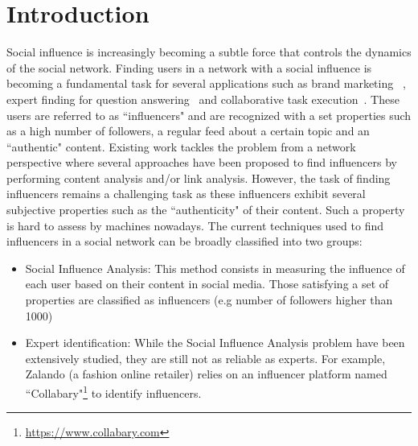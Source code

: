 \documentclass{article}
\begin{document}
\section{Introduction}
Social influence is increasingly becoming a subtle force that controls the dynamics of the social network. 
Finding users in a network with a social influence is becoming a fundamental 
task for several applications such as brand marketing
~\cite{bond201261,richardson2002mining,van2007new}, expert finding for question 
answering~\cite{riahi2012finding} and collaborative task execution~\cite{sun2014analyzing,miao2010generative}. These users are referred to as ``influencers"
and are recognized with a set properties such as a high number of 
followers, a regular feed about a certain topic and an ``authentic" content.
 Existing work tackles the problem from a network perspective where 
 several approaches have been proposed to find influencers by performing content analysis and/or link analysis. However, the task of finding influencers remains a challenging task as these influencers
exhibit several subjective properties such as the ``authenticity" of their
content. Such a property is hard to assess by machines nowadays.
The current techniques used to find influencers in a social network
can be broadly classified into two groups:
\begin{itemize}
\item Social Influence Analysis: This method consists in measuring the influence of each user 
based on their content in social media.
Those satisfying a set of properties are classified as influencers (e.g 
number of followers higher than 1000)
\cite{Cheng2014,Lehmann2013}
 
\item Expert identification: While the Social Influence Analysis
problem have been extensively studied, they are still not as reliable
as experts. For example, Zalando (a fashion online retailer)
relies on an influencer platform named ``Collabary"\footnote{\url{https://www.collabary.com}} to identify influencers.
\end{itemize}
\end{document}
